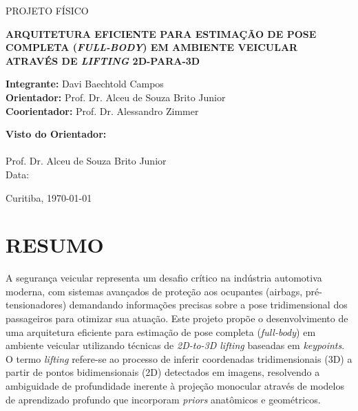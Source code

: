 \documentclass[12pt, a4paper]{article}
\begin{document}
\begin{titlepage}
    \centering
    {\large PROJETO FÍSICO \par}
    \vspace{1.5cm}
    {\bfseries\Large ARQUITETURA EFICIENTE PARA ESTIMAÇÃO DE POSE COMPLETA (\textit{FULL-BODY}) EM AMBIENTE VEICULAR ATRAVÉS DE \textit{LIFTING} 2D-PARA-3D \par}
    \vspace{2.5cm}

    \begin{flushleft}
        \textbf{Integrante:} Davi Baechtold Campos \\[0.3cm]
        \textbf{Orientador:} Prof. Dr. Alceu de Souza Brito Junior \\
        \textbf{Coorientador:} Prof. Dr. Alessandro Zimmer
    \end{flushleft}

    \vfill
    \begin{flushleft}
        \textbf{Visto do Orientador:}\\[1.4cm]
        \makebox[9cm]{\hrulefill}\\
        \small Prof. Dr. Alceu de Souza Brito Junior \\[0.5cm]
        Data: \underline{\hspace{3cm}}
    \end{flushleft}

    \vfill
    {\large Curitiba, \today \par}
\end{titlepage}

\tableofcontents
\newpage
\setcounter{page}{1}

\section{RESUMO}

A segurança veicular representa um desafio crítico na indústria automotiva moderna, com sistemas avançados de proteção aos ocupantes (airbags, pré-tensionadores) demandando informações precisas sobre a pose tridimensional dos passageiros para otimizar sua atuação. Este projeto propõe o desenvolvimento de uma arquitetura eficiente para estimação de pose completa (\textit{full-body}) em ambiente veicular utilizando técnicas de \textit{2D-to-3D lifting} baseadas em \textit{keypoints}. O termo \textit{lifting} refere-se ao processo de inferir coordenadas tridimensionais (3D) a partir de pontos bidimensionais (2D) detectados em imagens, resolvendo a ambiguidade de profundidade inerente à projeção monocular através de modelos de aprendizado profundo que incorporam \textit{priors} anatômicos e geométricos.
\end{document}
